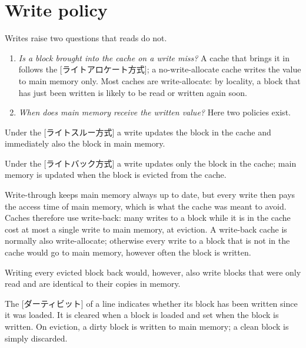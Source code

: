 \documentclass[../main.tex]{subfiles}
\begin{document}
\section{Write policy}
\label{sec:l12-write}

Writes raise two questions that reads do not.

\begin{enumerate}
  \item \emph{Is a block brought into the cache on a write miss?}  A cache
    that brings it in follows the
    [ライトアロケート方式]; a no-write-allocate
    cache writes the value to main memory only.  Most caches are
    write-allocate: by locality, a block that has just been written is likely
    to be read or written again soon.
  \item \emph{When does main memory receive the written value?}  Here two
    policies exist.
\end{enumerate}

\begin{definition}
  Under the [ライトスルー方式] a write updates
  the block in the cache and immediately also the block in main memory.

  Under the [ライトバック方式] a write updates only
  the block in the cache; main memory is updated when the block is evicted
  from the cache.
\end{definition}

Write-through keeps main memory always up to date, but every write then pays
the access time of main memory, which is what the cache was meant to avoid.
Caches therefore use write-back: many writes to a block while it is in the
cache cost at most a single write to main memory, at eviction.  A write-back
cache is normally also write-allocate; otherwise every write to a block that
is not in the cache would go to main memory, however often the block is
written.

Writing every evicted block back would, however, also write blocks that were
only read and are identical to their copies in memory.

\begin{definition}
  The [ダーティビット] of a line indicates whether its block
  has been written since it was loaded.  It is cleared when a block is loaded
  and set when the block is written.  On eviction, a dirty block is written to
  main memory; a clean block is simply discarded.
\end{definition}
\end{document}
